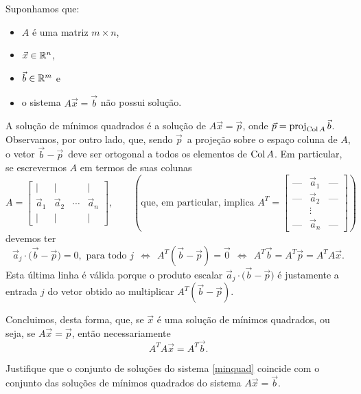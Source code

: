 \documentclass[../livro.tex]{subfiles}  %
\begin{document}
Suponhamos que:
\begin{itemize}
\item $A$ é uma matriz $m \times n$,
\item $\vec{x} \in \mathbb{R}^n$,
\item $\vec{b} \in \mathbb{R}^m$ e
\item o sistema $A \vec{x} = \vec{b}$ não possui solução.
\end{itemize} A solução de mínimos quadrados é a solução de $A \vec{x} = \vec{p}$, onde $\vec{p} = \operatorname{proj}_{\operatorname{Col} A} \vec{b}$. Observamos, por outro lado, que, sendo $\vec{p}\,$ a projeção sobre o espaço coluna de $A$, o vetor $\vec{b} - \vec{p}\,$ deve ser ortogonal a todos os elementos de $\operatorname{Col} A$. Em particular, se escrevermos $A$ em termos de suas colunas
\begin{equation}
A =
\begin{bmatrix}
  | & | &   & | \\
  \vec{a}_1 & \vec{a}_2 & \cdots  & \vec{a}_n \\
  | & | &   & |
\end{bmatrix}, \qquad \left( \text{que,  em particular, implica }
  A^T = \begin{bmatrix}
    \text{---} & \vec{a}_1  & \text{---} \\
    \text{---} & \vec{a}_2  & \text{---} \\
    & \vdots     &  \\
    \text{---} & \vec{a}_n  & \text{---}
  \end{bmatrix}\right)
\end{equation} devemos ter
\begin{equation}
\vec{a}_j \cdot \big(\vec{b} - \vec{p}\big) = 0, \text{ para todo } j  \ \  \iff \ \
A^T (\vec{b} - \vec{p}) = \vec{0} \ \ \iff \ \ A^T \vec{b} = A^T \vec{p} = A^T A\vec{x}.
\end{equation} Esta última linha é válida porque o produto escalar $\vec{a}_j \cdot \big(\vec{b} - \vec{p}\big)$ é justamente a entrada $j$ do vetor obtido ao multiplicar $A^T(\vec{b} - \vec{p})$.

Concluimos, desta forma, que, se $\vec{x}$ é uma solução de mínimos quadrados, ou seja, se $A \vec{x} = \vec{p}$, então necessariamente
\begin{equation}\label{minquad}
  \boxed{A^T A\vec{x} = A^T \vec{b}.}
\end{equation}

\begin{exercise}[Teórico]
  Justifique que o conjunto de soluções do sistema \eqref{minquad} coincide com o conjunto das soluções de mínimos quadrados do sistema $A \vec{x} = \vec{b}$.
\end{exercise}
\end{document}
